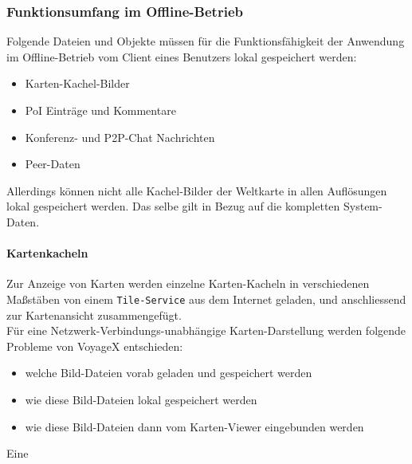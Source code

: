 \subsubsection{Funktionsumfang im Offline-Betrieb}
Folgende Dateien und Objekte müssen für die Funktionsfähigkeit der Anwendung im Offline-Betrieb vom Client eines Benutzers lokal gespeichert werden:
\begin{itemize}
  \item Karten-Kachel-Bilder
  \item PoI Einträge und Kommentare
  \item Konferenz- und P2P-Chat Nachrichten
  \item Peer-Daten
\end{itemize}
Allerdings können nicht alle Kachel-Bilder der Weltkarte in allen Auflösungen lokal gespeichert werden.
Das selbe gilt in Bezug auf die kompletten System-Daten. 

\paragraph{Kartenkacheln}
Zur Anzeige von Karten werden einzelne Karten-Kacheln in verschiedenen Maßstäben von einem \texttt{Tile-Service} aus dem Internet geladen, und anschliessend zur Kartenansicht zusammengefügt.\\
Für eine Netzwerk-Verbindungs-unabhängige Karten-Darstellung werden folgende Probleme von VoyageX entschieden: 
	\begin{itemize}
		\item welche Bild-Dateien vorab geladen und gespeichert werden%
		\item wie diese Bild-Dateien lokal gespeichert werden%
		\item wie diese Bild-Dateien dann vom Karten-Viewer eingebunden werden%
	\end{itemize}
Eine 
